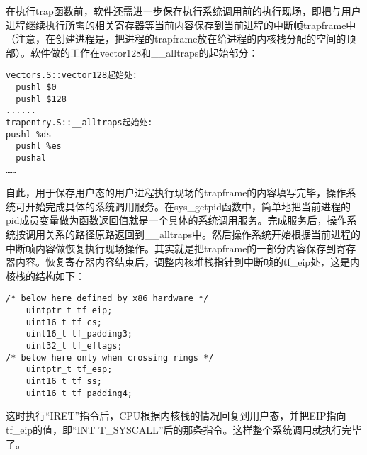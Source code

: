 在执行trap函数前，软件还需进一步保存执行系统调用前的执行现场，即把与用户进程继续执行所需的相关寄存器等当前内容保存到当前进程的中断帧trapframe中（注意，在创建进程是，把进程的trapframe放在给进程的内核栈分配的空间的顶部）。软件做的工作在vector128和\_\_alltraps的起始部分：

\begin{lstlisting}
vectors.S::vector128起始处:
  pushl $0
  pushl $128
......
trapentry.S::__alltraps起始处:
pushl %ds
  pushl %es
  pushal
……
\end{lstlisting}

自此，用于保存用户态的用户进程执行现场的trapframe的内容填写完毕，操作系统可开始完成具体的系统调用服务。在sys\_getpid函数中，简单地把当前进程的pid成员变量做为函数返回值就是一个具体的系统调用服务。完成服务后，操作系统按调用关系的路径原路返回到\_\_alltraps中。然后操作系统开始根据当前进程的中断帧内容做恢复执行现场操作。其实就是把trapframe的一部分内容保存到寄存器内容。恢复寄存器内容结束后，调整内核堆栈指针到中断帧的tf\_eip处，这是内核栈的结构如下：

\begin{lstlisting}
/* below here defined by x86 hardware */
    uintptr_t tf_eip;
    uint16_t tf_cs;
    uint16_t tf_padding3;
    uint32_t tf_eflags;
/* below here only when crossing rings */
    uintptr_t tf_esp;
    uint16_t tf_ss;
    uint16_t tf_padding4;
\end{lstlisting}

这时执行``IRET''指令后，CPU根据内核栈的情况回复到用户态，并把EIP指向tf\_eip的值，即``INT
T\_SYSCALL''后的那条指令。这样整个系统调用就执行完毕了。
